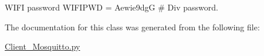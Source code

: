W\+I\+FI password W\+I\+F\+I\+P\+WD = \textquotesingle{}Aewie9dgG\textquotesingle{} \# Div password. 



The documentation for this class was generated from the following file\+:\begin{DoxyCompactItemize}
\item 
\mbox{\hyperlink{_client___mosquitto_8py}{Client\+\_\+\+Mosquitto.\+py}}\end{DoxyCompactItemize}
